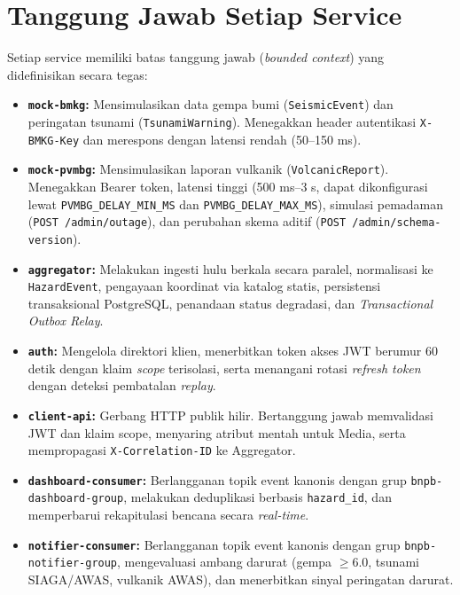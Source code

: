 \section{Tanggung Jawab Setiap Service}
Setiap service memiliki batas tanggung jawab (\textit{bounded context}) yang didefinisikan secara tegas:
\begin{itemize}
    \item \textbf{\texttt{mock-bmkg}:} Mensimulasikan data gempa bumi (\texttt{SeismicEvent}) dan peringatan tsunami (\texttt{TsunamiWarning}). Menegakkan header autentikasi \texttt{X-BMKG-Key} dan merespons dengan latensi rendah (50--150 ms).
    \item \textbf{\texttt{mock-pvmbg}:} Mensimulasikan laporan vulkanik (\texttt{VolcanicReport}). Menegakkan Bearer token, latensi tinggi (500 ms--3 s, dapat dikonfigurasi lewat \texttt{PVMBG\_DELAY\_MIN\_MS} dan \texttt{PVMBG\_DELAY\_MAX\_MS}), simulasi pemadaman (\texttt{POST /admin/outage}), dan perubahan skema aditif (\texttt{POST /admin/schema-version}).
    \item \textbf{\texttt{aggregator}:} Melakukan ingesti hulu berkala secara paralel, normalisasi ke \texttt{HazardEvent}, pengayaan koordinat via katalog statis, persistensi transaksional PostgreSQL, penandaan status degradasi, dan \textit{Transactional Outbox Relay}.
    \item \textbf{\texttt{auth}:} Mengelola direktori klien, menerbitkan token akses JWT berumur 60 detik dengan klaim \textit{scope} terisolasi, serta menangani rotasi \textit{refresh token} dengan deteksi pembatalan \textit{replay}.
    \item \textbf{\texttt{client-api}:} Gerbang HTTP publik hilir. Bertanggung jawab memvalidasi JWT dan klaim scope, menyaring atribut mentah untuk Media, serta mempropagasi \texttt{X-Correlation-ID} ke Aggregator.
    \item \textbf{\texttt{dashboard-consumer}:} Berlangganan topik event kanonis dengan grup \texttt{bnpb-}\allowbreak\texttt{dashboard-}\allowbreak\texttt{group}, melakukan deduplikasi berbasis \texttt{hazard\_id}, dan memperbarui rekapitulasi bencana secara \textit{real-time}.
    \item \textbf{\texttt{notifier-consumer}:} Berlangganan topik event kanonis dengan grup \texttt{bnpb-}\allowbreak\texttt{notifier-}\allowbreak\texttt{group}, mengevaluasi ambang darurat (gempa $\ge 6.0$, tsunami SIAGA/AWAS, vulkanik AWAS), dan menerbitkan sinyal peringatan darurat.
\end{itemize}

